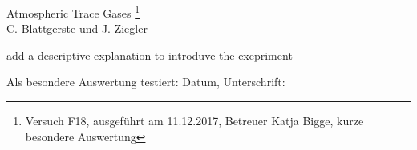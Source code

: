 \documentclass[12pt]{article}
\begin{document}
\thispagestyle{empty}
\null\vspace{40mm}
\begin{center}
{
\Large  Atmospheric Trace Gases
\footnote{\noindent Versuch F18, ausgeführt am 11.12.2017, Betreuer Katja Bigge, kurze besondere Auswertung}
}\\[15mm]

C. Blattgerste und J. Ziegler

\vspace{25mm}

\parbox{0.9\textwidth}{

\small  add a descriptive explanation to introduve the exepriment
}
\end{center}

\vfill
Als besondere Auswertung testiert: Datum, Unterschrift:
\vspace{20mm}

\newpage
\null\thispagestyle{empty}

\newpage     %
\tableofcontents
{}
\newpage
\end{document}
